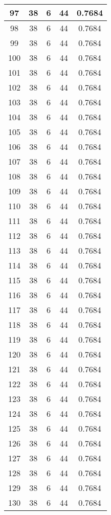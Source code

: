 \documentclass[letterpaper, 12pt]{article}
\begin{document}
\begin{longtable}{|c|c|c|c|c|}
\hline
97 & 38 & 6 & 44 & 0.7684 \\
\hline
98 & 38 & 6 & 44 & 0.7684 \\
\hline
99 & 38 & 6 & 44 & 0.7684 \\
\hline
100 & 38 & 6 & 44 & 0.7684 \\
\hline
101 & 38 & 6 & 44 & 0.7684 \\
\hline
102 & 38 & 6 & 44 & 0.7684 \\
\hline
103 & 38 & 6 & 44 & 0.7684 \\
\hline
104 & 38 & 6 & 44 & 0.7684 \\
\hline
105 & 38 & 6 & 44 & 0.7684 \\
\hline
106 & 38 & 6 & 44 & 0.7684 \\
\hline
107 & 38 & 6 & 44 & 0.7684 \\
\hline
108 & 38 & 6 & 44 & 0.7684 \\
\hline
109 & 38 & 6 & 44 & 0.7684 \\
\hline
110 & 38 & 6 & 44 & 0.7684 \\
\hline
111 & 38 & 6 & 44 & 0.7684 \\
\hline
112 & 38 & 6 & 44 & 0.7684 \\
\hline
113 & 38 & 6 & 44 & 0.7684 \\
\hline
114 & 38 & 6 & 44 & 0.7684 \\
\hline
115 & 38 & 6 & 44 & 0.7684 \\
\hline
116 & 38 & 6 & 44 & 0.7684 \\
\hline
117 & 38 & 6 & 44 & 0.7684 \\
\hline
118 & 38 & 6 & 44 & 0.7684 \\
\hline
119 & 38 & 6 & 44 & 0.7684 \\
\hline
120 & 38 & 6 & 44 & 0.7684 \\
\hline
121 & 38 & 6 & 44 & 0.7684 \\
\hline
122 & 38 & 6 & 44 & 0.7684 \\
\hline
123 & 38 & 6 & 44 & 0.7684 \\
\hline
124 & 38 & 6 & 44 & 0.7684 \\
\hline
125 & 38 & 6 & 44 & 0.7684 \\
\hline
126 & 38 & 6 & 44 & 0.7684 \\
\hline
127 & 38 & 6 & 44 & 0.7684 \\
\hline
128 & 38 & 6 & 44 & 0.7684 \\
\hline
129 & 38 & 6 & 44 & 0.7684 \\
\hline
130 & 38 & 6 & 44 & 0.7684 \\

\end{longtable}
\end{document}
